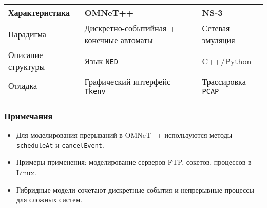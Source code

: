 \begin{center}
    \begin{tabular}{|l|l|l|}
        \hline
        \textbf{Характеристика} & \textbf{OMNeT++} & \textbf{NS-3} \\
        \hline
        Парадигма & Дискретно-событийная + конечные автоматы & Сетевая эмуляция \\
        \hline
        Описание структуры & Язык \texttt{NED} & C++/Python \\
        \hline
        Отладка & Графический интерфейс \texttt{Tkenv} & Трассировка \texttt{PCAP} \\
        \hline
    \end{tabular}
\end{center}

\subsubsection*{Примечания}
\begin{itemize}
    \item Для моделирования прерываний в OMNeT++ используются методы \texttt{scheduleAt} и \texttt{cancelEvent}.
    \item Примеры применения: моделирование серверов FTP, сокетов, процессов в Linux.
    \item Гибридные модели сочетают дискретные события и непрерывные процессы для сложных систем.
\end{itemize}


